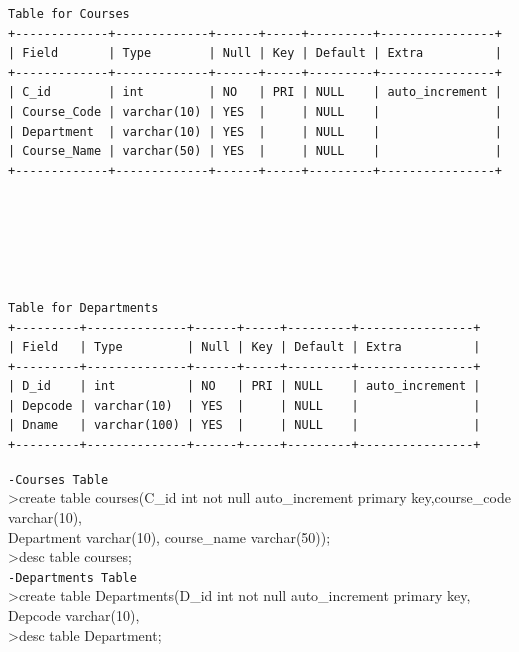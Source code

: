 \documentclass{article}
\begin{document}
\begin{verbatim}
Table for Courses
+-------------+-------------+------+-----+---------+----------------+
| Field       | Type        | Null | Key | Default | Extra          |
+-------------+-------------+------+-----+---------+----------------+
| C_id        | int         | NO   | PRI | NULL    | auto_increment |
| Course_Code | varchar(10) | YES  |     | NULL    |                |
| Department  | varchar(10) | YES  |     | NULL    |                |
| Course_Name | varchar(50) | YES  |     | NULL    |                |
+-------------+-------------+------+-----+---------+----------------+






Table for Departments
+---------+--------------+------+-----+---------+----------------+
| Field   | Type         | Null | Key | Default | Extra          |
+---------+--------------+------+-----+---------+----------------+
| D_id    | int          | NO   | PRI | NULL    | auto_increment |
| Depcode | varchar(10)  | YES  |     | NULL    |                |
| Dname   | varchar(100) | YES  |     | NULL    |                |
+---------+--------------+------+-----+---------+----------------+

\end{verbatim}

\newpage
\begin{flushleft}
\texttt{-Courses Table}\\
\vspace{0.1in}\hspace{0.3in}\textgreater create table courses(C\_id int not null auto\_increment primary key,course\_code \vspace{0.1in}varchar(10),\\ \hspace{0.3in}\vspace{0.1in} Department varchar(10), course\_name varchar(50));\\
\hspace{0.2in}\textgreater desc table courses;\\
\texttt{-Departments Table}\\
\vspace{0.1in}\hspace{0.3in}\textgreater create table Departments(D\_id int not null auto\_increment primary \vspace{0.1in}key,\\ \hspace{0.4in}\vspace{0.1in} Depcode varchar(10),\\ 
\hspace{0.5in}\textgreater desc table Department;
\end{flushleft}
\newpage
\end{document}
